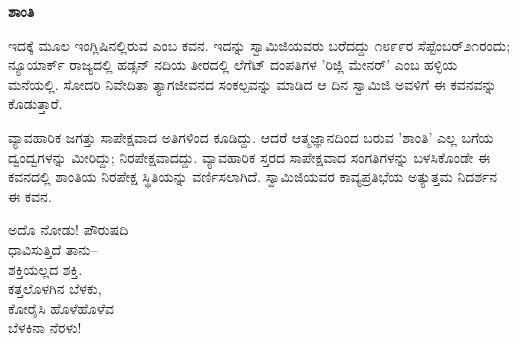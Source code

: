 \begin{myquote}
\end{myquote}

\begin{myquote}
\end{myquote}

\begin{myquote}
\end{myquote}

\begin{myquote}
\end{myquote}

\begin{center}
\textbf{ಶಾಂತಿ}
\end{center}

ಇದಕ್ಕೆ ಮೂಲ ಇಂಗ್ಲಿಷಿನಲ್ಲಿರುವ  ಎಂಬ ಕವನ. ಇದನ್ನು ಸ್ವಾಮಿಜಿಯವರು ಬರೆದದ್ದು ೧೮೯೯ರ ಸೆಪ್ಟೆಂಬರ್೨೧ರಂದು; ನ್ಯೂಯಾರ್ಕ್ ರಾಜ್ಯದಲ್ಲಿ ಹಡ್ಸನ್ ನದಿಯ ತೀರದಲ್ಲಿ ಲೆಗೆಟ್ ದಂಪತಿಗಳ 'ರಿಜ್ಲಿ ಮೇನರ್' ಎಂಬ ಹಳ್ಳಿಯ ಮನೆಯಲ್ಲಿ. ಸೋದರಿ ನಿವೇದಿತಾ ತ್ಯಾಗಜೀವನದ ಸಂಕಲ್ಪವನ್ನು ಮಾಡಿದ ಆ ದಿನ ಸ್ವಾಮಿಜಿ ಅವಳಿಗೆ ಈ ಕವನವನ್ನು ಕೊಡುತ್ತಾರೆ.

ವ್ಯಾವಹಾರಿಕ ಜಗತ್ತು ಸಾಪೇಕ್ಷವಾದ ಅತಿಗಳಿಂದ ಕೂಡಿದ್ದು. ಆದರೆ ಆತ್ಮಜ್ಞಾನದಿಂದ ಬರುವ 'ಶಾಂತಿ' ಎಲ್ಲ ಬಗೆಯ ದ್ವಂದ್ವಗಳನ್ನು ಮೀರಿದ್ದು; ನಿರಪೇಕ್ಷವಾದದ್ದು. ವ್ಯಾವಹಾರಿಕ ಸ್ತರದ ಸಾಪೇಕ್ಷವಾದ ಸಂಗತಿಗಳನ್ನು ಬಳಸಿಕೊಂಡೇ ಈ ಕವನದಲ್ಲಿ ಶಾಂತಿಯ ನಿರಪೇಕ್ಷ ಸ್ಥಿತಿಯನ್ನು ವರ್ಣಿಸಲಾಗಿದೆ. ಸ್ವಾಮಿಜಿಯವರ ಕಾವ್ಯಪ್ರತಿಭೆಯ ಅತ್ಯುತ್ತಮ ನಿದರ್ಶನ ಈ ಕವನ.

\begin{myquote}
ಅದೊ ನೋಡು! ಪೌರುಷದಿ\\ಧಾವಿಸುತ್ತಿದೆ ತಾನು–\\ಶಕ್ತಿಯಲ್ಲದ ಶಕ್ತಿ.\\ಕತ್ತಲೊಳಗಿನ ಬೆಳಕು,\\ಕೋರೈಸಿ ಹೊಳೆಹೊಳೆವ\\ಬೆಳಕಿನಾ ನೆರಳು!
\end{myquote}

